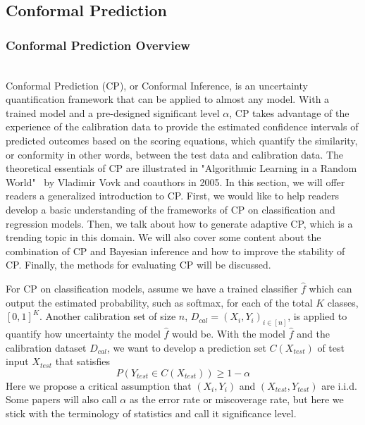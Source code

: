 \subsection{Conformal Prediction}
\subsubsection{Conformal Prediction Overview}\hfill\\
Conformal Prediction (CP), or Conformal Inference,  is an uncertainty quantification framework that can be applied to almost any model.  With a trained model and a pre-designed significant level $\alpha$, CP takes advantage of the experience of the calibration data to provide the estimated confidence intervals of predicted outcomes based on the scoring equations, which quantify the similarity, or conformity in other words, between the test data and calibration data. The theoretical essentials of CP are illustrated in "Algorithmic Learning in a Random World"~\cite{vovk2005algorithmic} by Vladimir Vovk and coauthors in 2005. In this section, we will offer readers a generalized introduction to CP. First, we would like to help readers develop a basic understanding of the frameworks of CP on classification and regression models. Then, we talk about how to generate adaptive CP, which is a trending topic in this domain. We will also cover some content about the combination of CP and Bayesian inference and how to improve the stability of CP. Finally, the methods for evaluating CP will be discussed.

For CP on classification models, assume we have a trained classifier $\hat{f}$ which can output the estimated probability, such as softmax, for each of the total $K$ classes, $[0,1]^K$. Another calibration set of size $n$, $D_{cal}=(X_i,Y_i)_{i\in[n]}$, is applied to quantify how uncertainty the model $\hat{f}$ would be.  With the model $\hat{f}$ and the calibration dataset $D_{cal}$, we want to develop a prediction set $C(X_{test})$ of test input $X_{test}$ that satisfies
\begin{equation} \label{prediction set}
P(Y_{test}\in C(X_{test})) \ge 1-\alpha
\end{equation}
Here we propose a critical assumption that $(X_i, Y_i)$ and $(X_{test}, Y_{test})$ are i.i.d. Some papers will also call $\alpha$ as the error rate or miscoverage rate, but here we stick with the terminology of statistics and call it significance level.

